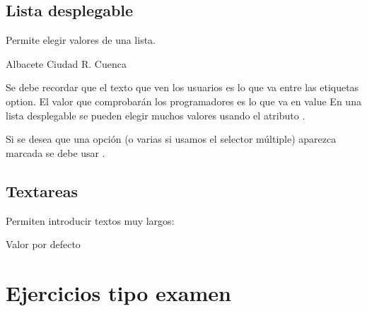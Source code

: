 \documentclass[letterpaper,10pt,spanish]{sphinxmanual}
\begin{document}
\subsection{Lista desplegable}
\label{\detokenize{tema2:lista-desplegable}}
Permite elegir valores de una lista.

\begin{sphinxVerbatim}[commandchars=\\\{\}]
 
         Albacete
         Ciudad R.
         Cuenca
\end{sphinxVerbatim}

Se debe recordar que el texto que ven los usuarios es lo que va entre las etiquetas option. El valor que comprobarán los programadores es lo que va en value En una lista desplegable se pueden elegir muchos valores usando el atributo .

Si se desea que una opción (o varias si usamos el selector múltiple) aparezca marcada se debe usar .


\subsection{Textareas}
\label{\detokenize{tema2:textareas}}
Permiten introducir textos muy largos:

\begin{sphinxVerbatim}[commandchars=\\\{\}]
  
        Valor por defecto
\end{sphinxVerbatim}


\section{Ejercicios tipo examen}
\label{\detokenize{tema2:ejercicios-tipo-examen}}
\end{document}

